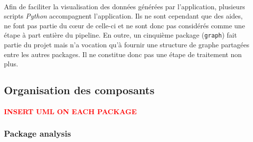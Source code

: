\documentclass{scrartcl}
\newcommand{\TODO}[1] {
    \noindent \paragraph{\textcolor{red}{#1}}
}
\begin{document}
    \paragraph{}Afin de faciliter la visualisation des données générées par l'application, plusieurs scripts \textit{Python} accompagnent l'application. Ils ne sont cependant que des aides, ne font pas partie du cœur de celle-ci et ne sont donc pas considérés comme une étape à part entière du pipeline. En outre, un cinquième package (\texttt{graph}) fait partie du projet mais n'a vocation qu'à fournir une structure de graphe partagées entre les autres packages. Il ne constitue donc pas une étape de traitement non plus.

\subsection{Organisation des composants}
\TODO{INSERT UML ON EACH PACKAGE}

\subsubsection{Package analysis}
\end{document}
